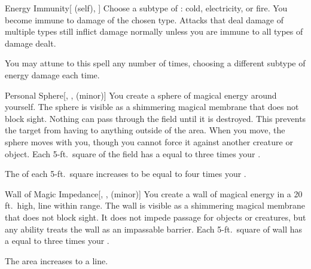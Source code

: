 \lowercase{\hypertarget{spell:Energy Immunity}{}}\label{spell:Energy Immunity}
\begin{attuneability}[Rank 5]{\hypertarget{spell:Energy Immunity}{Energy Immunity}}[ (self), ]
Choose a subtype of : cold, electricity, or fire.
You become immune to damage of the chosen type.
Attacks that deal damage of multiple types still inflict damage normally unless you are immune to all types of damage dealt.

\rankline
{} You may attune to this spell any number of times, choosing a different subtype of energy damage each time.
\end{attuneability}
\vspace{0.25em}



\lowercase{\hypertarget{spell:Personal Sphere}{}}\label{spell:Personal Sphere}
\begin{freeability}[Rank 5]{\hypertarget{spell:Personal Sphere}{Personal Sphere}}[, ,  (minor)]
You create a sphere of magical energy around yourself.
The sphere is visible as a shimmering magical membrane that does not block sight.
Nothing can pass through the field until it is destroyed.
This prevents the target from having  to anything outside of the area.
When you move, the sphere moves with you, though you cannot force it against another creature or object.
Each 5-ft.\ square of the field has a  equal to three times your .

\rankline
{} The  of each 5-ft.\ square increases to be equal to four times your .
\end{freeability}
\vspace{0.25em}



\lowercase{\hypertarget{spell:Wall of Magic Impedance}{}}\label{spell:Wall of Magic Impedance}
\begin{freeability}[Rank 5]{\hypertarget{spell:Wall of Magic Impedance}{Wall of Magic Impedance}}[, ,  (minor)]
\targetrule
You create a wall of magical energy in a 20 ft.\ high, \areamed line within \rngmed range.
The wall is visible as a shimmering magical membrane that does not block sight.
It does not impede passage for objects or creatures, but any  ability treats the wall as an impassable barrier.
Each 5-ft.\ square of wall has a  equal to three times your .

\rankline
{} The area increases to a \arealarge line.
\end{freeability}
\vspace{0.25em}



